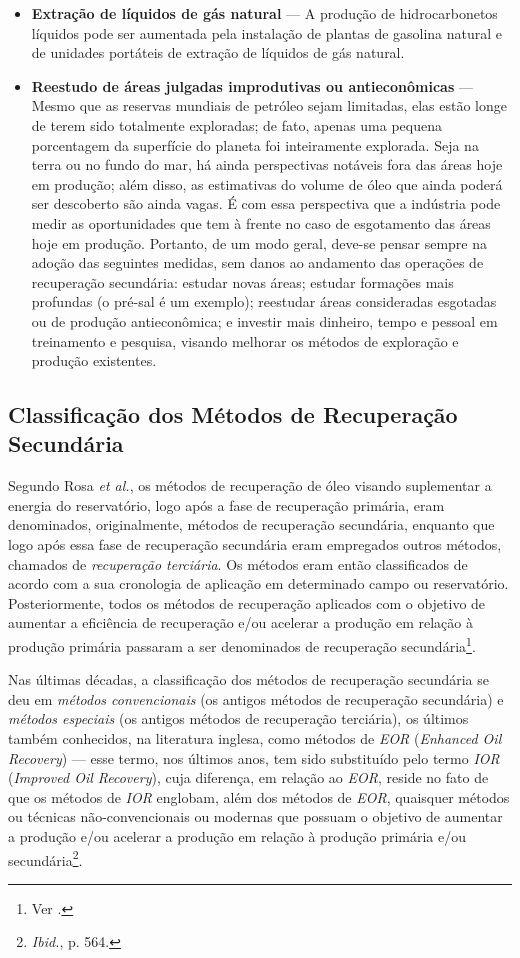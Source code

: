\begin{itemize}
\item \textbf{Extração de líquidos de gás natural} --- A produção de hidrocarbonetos líquidos pode ser aumentada pela instalação de plantas de gasolina natural e de unidades portáteis de extração de líquidos de gás natural.
\item \textbf{Reestudo de áreas julgadas improdutivas ou antieconômicas} --- Mesmo que as reservas mundiais de petróleo sejam limitadas, elas estão longe de terem sido totalmente exploradas; de fato, apenas uma pequena porcentagem da superfície do planeta foi inteiramente explorada. Seja na terra ou no fundo do mar, há ainda perspectivas notáveis fora das áreas hoje em produção; além disso, as estimativas do volume de óleo que ainda poderá ser descoberto são ainda vagas. É com essa perspectiva que a indústria pode medir as oportunidades que tem à frente no caso de esgotamento das áreas hoje em produção. Portanto, de um modo geral, deve-se pensar sempre na adoção das seguintes medidas, sem danos ao andamento das operações de recuperação secundária: estudar novas áreas; estudar formações mais profundas (o pré-sal é um exemplo); reestudar áreas consideradas esgotadas ou de produção antieconômica; e investir mais dinheiro, tempo e pessoal em treinamento e pesquisa, visando melhorar os métodos de exploração e produção existentes.
\end{itemize}

\subsection{Classificação dos Métodos de Recuperação Secundária}
Segundo Rosa \textit{et al.}, os métodos de recuperação de óleo visando suplementar a energia do reservatório, logo após a fase de recuperação primária, eram denominados, originalmente, métodos de recuperação secundária, enquanto que logo após essa fase de recuperação secundária eram empregados outros métodos, chamados de \textit{recuperação terciária}. Os métodos eram então classificados de acordo com a sua cronologia de aplicação em determinado campo ou reservatório. Posteriormente, todos os métodos de recuperação aplicados com o objetivo de aumentar a eficiência de recuperação e/ou acelerar a produção em relação à produção primária passaram a ser denominados de recuperação secundária\footnote{Ver \cite[p. 564]{engres}.}.

Nas últimas décadas, a classificação dos métodos de recuperação secundária se deu em \textit{métodos convencionais} (os antigos métodos de recuperação secundária) e \textit{métodos especiais} (os antigos métodos de recuperação terciária), os últimos também conhecidos, na literatura inglesa, como métodos de \textit{EOR} (\textit{Enhanced Oil Recovery}) --- esse termo, nos últimos anos, tem sido substituído pelo termo \textit{IOR} (\textit{Improved Oil Recovery}), cuja diferença, em relação ao \textit{EOR}, reside no fato de que os métodos de \textit{IOR} englobam, além dos métodos de \textit{EOR}, quaisquer métodos ou técnicas não-convencionais ou modernas que possuam o objetivo de aumentar a produção e/ou acelerar a produção em relação à produção primária e/ou secundária\footnote{\textit{Ibid.}, p. 564.}. 

